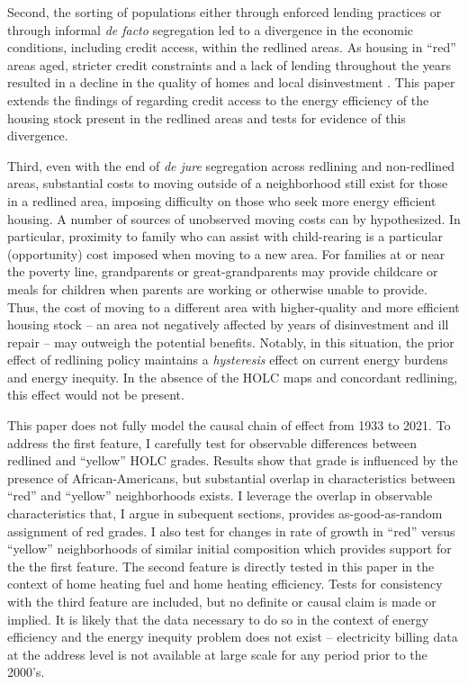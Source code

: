 \documentclass[
]{article}
\begin{document}
Second, the sorting of populations either through enforced lending practices or through informal \emph{de facto} segregation led to a divergence in the economic conditions, including credit access, within the redlined areas. As housing in ``red'' areas aged, stricter credit constraints and a lack of lending throughout the years resulted in a decline in the quality of homes and local disinvestment \citep{Aaronson2021}. This paper extends the findings of \citet{Aaronson2021} regarding credit access to the energy efficiency of the housing stock present in the redlined areas and tests for evidence of this divergence.

Third, even with the end of \emph{de jure} segregation across redlining and non-redlined areas, substantial costs to moving outside of a neighborhood still exist for those in a redlined area, imposing difficulty on those who seek more energy efficient housing. A number of sources of unobserved moving costs can by hypothesized. In particular, proximity to family who can assist with child-rearing is a particular (opportunity) cost imposed when moving to a new area. For families at or near the poverty line, grandparents or great-grandparents may provide childcare or meals for children when parents are working or otherwise unable to provide. Thus, the cost of moving to a different area with higher-quality and more efficient housing stock -- an area not negatively affected by years of disinvestment and ill repair -- may outweigh the potential benefits. Notably, in this situation, the prior effect of redlining policy maintains a \emph{hysteresis} effect on current energy burdens and energy inequity. In the absence of the HOLC maps and concordant redlining, this effect would not be present.

This paper does not fully model the causal chain of effect from 1933 to 2021. To address the first feature, I carefully test for observable differences between redlined and ``yellow'' HOLC grades. Results show that grade is influenced by the presence of African-Americans, but substantial overlap in characteristics between ``red'' and ``yellow'' neighborhoods exists. I leverage the overlap in observable characteristics that, I argue in subequent sections, provides as-good-as-random assignment of red grades. I also test for changes in rate of growth in ``red'' versus ``yellow'' neighborhoods of similar initial composition which provides support for the the first feature. The second feature is directly tested in this paper in the context of home heating fuel and home heating efficiency. Tests for consistency with the third feature are included, but no definite or causal claim is made or implied. It is likely that the data necessary to do so in the context of energy efficiency and the energy inequity problem does not exist -- electricity billing data at the address level is not available at large scale for any period prior to the 2000's.
\end{document}
